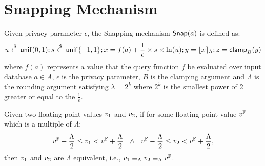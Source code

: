 \documentclass[a4paper,11pt]{article}
\begin{document}
\newpage
\section{Snapping Mechanism}

\begin{defn}
Given privacy parameter $\epsilon$, the Snapping mechanism $\mathsf{Snap}(a)$ is defined as:
\[
	u \xleftarrow{\$} \mathsf{unif}(0,1); s \xleftarrow{\$} \mathsf{unif}\{-1, 1\};
	x = f(a) + \frac{1}{\epsilon} \times s \times \ln (u);
	y = \lfloor x \rceil_{\Lambda};
	z = \mathsf{clamp}_B (y)
\]
where $f(a)$ represents a value that the query function $f$ be evaluated over input database $a \in A$, $\epsilon$ is the privacy parameter, $B$ is the clamping argument and $\Lambda$ is the rounding argument satisfying $\lambda = 2^k$ where $2^k$ is the smallest power of 2 greater or equal to the $\frac{1}{\epsilon}$.
\end{defn}

\begin{defn}
Given two floating point values $v_1$ and $v_2$, if for some floating point value $v^{\mathbb{F}}$ which is a multiple of $\Lambda$:
\[
	v^{\mathbb{F}} - \frac{\Lambda}{2} \leq v_1 < v^{\mathbb{F}} + \frac{\Lambda}{2}
	~~
	\land
	~~
	v^{\mathbb{F}} - \frac{\Lambda}{2} \leq v_2 < v^{\mathbb{F}} + \frac{\Lambda}{2},	
\]
then $v_1$ and $v_2$ are $\Lambda$ equivalent, i.e., 
$v_1 \equiv_{\Lambda} v_2 \equiv_{\Lambda} v^{\mathbb{F}}$.
\end{defn}
%
\end{document}
